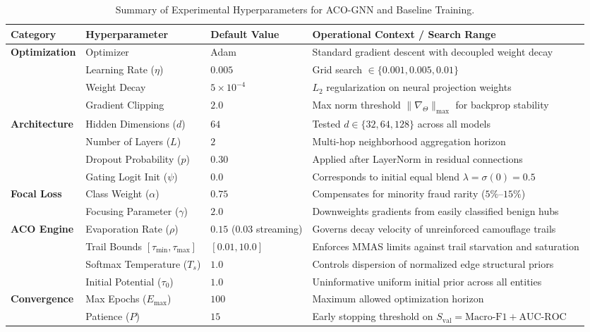 \begin{table}[!htbp]
\centering
\begin{spacing}{1.0}
\scriptsize
\setlength{\tabcolsep}{5pt}
\renewcommand{\arraystretch}{1.04}
\caption[Summary of Hyperparameters for ACO-GNN and Baselines]{Summary of Experimental Hyperparameters for ACO-GNN and Baseline Training.}
\label{tab:hyperparameters}
\begin{tabularx}{\textwidth}{@{}l l l >{\raggedright\arraybackslash}X@{}}
\toprule
\textbf{Category} & \textbf{Hyperparameter} & \textbf{Default Value} & \textbf{Operational Context / Search Range} \\ \midrule
\multirow{4}{*}{\textbf{Optimization}} 
 & Optimizer & Adam & Standard gradient descent with decoupled weight decay \\
 & Learning Rate ($\eta$) & $0.005$ & Grid search $\in \{0.001, 0.005, 0.01\}$ \\
 & Weight Decay & $5 \times 10^{-4}$ & $L_2$ regularization on neural projection weights \\
 & Gradient Clipping & $2.0$ & Max norm threshold $\|\nabla_\Theta\|_{\max}$ for backprop stability \\ \midrule
\multirow{4}{*}{\textbf{Architecture}} 
 & Hidden Dimensions ($d$) & $64$ & Tested $d \in \{32, 64, 128\}$ across all models \\
 & Number of Layers ($L$) & $2$ & Multi-hop neighborhood aggregation horizon \\
 & Dropout Probability ($p$) & $0.30$ & Applied after LayerNorm in residual connections \\
 & Gating Logit Init ($\psi$) & $0.0$ & Corresponds to initial equal blend $\lambda = \sigma(0) = 0.5$ \\ \midrule
\multirow{2}{*}{\textbf{Focal Loss}} 
 & Class Weight ($\alpha$) & $0.75$ & Compensates for minority fraud rarity ($5\%$--$15\%$) \\
 & Focusing Parameter ($\gamma$) & $2.0$ & Downweights gradients from easily classified benign hubs \\ \midrule
\multirow{4}{*}{\textbf{ACO Engine}} 
 & Evaporation Rate ($\rho$) & $0.15$ ($0.03$ streaming) & Governs decay velocity of unreinforced camouflage trails \\
 & Trail Bounds $[\tau_{\min}, \tau_{\max}]$ & $[0.01, 10.0]$ & Enforces MMAS limits against trail starvation and saturation \\
 & Softmax Temperature ($T_s$) & $1.0$ & Controls dispersion of normalized edge structural priors \\
 & Initial Potential ($\tau_0$) & $1.0$ & Uninformative uniform initial prior across all entities \\ \midrule
\multirow{2}{*}{\textbf{Convergence}} 
 & Max Epochs ($E_{\max}$) & $100$ & Maximum allowed optimization horizon \\
 & Patience ($P$) & $15$ & Early stopping threshold on $S_{\text{val}} = \text{Macro-F1} + \text{AUC-ROC}$ \\
\bottomrule
\end{tabularx}
\end{spacing}
\end{table}

